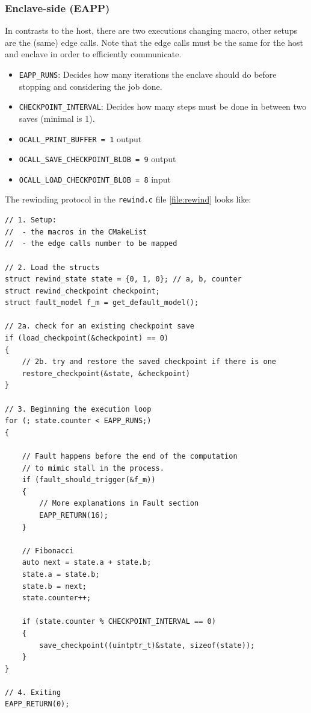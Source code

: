 \documentclass[11pt,a4paper]{report}
\begin{document}
\subsubsection{Enclave-side (EAPP)}
In contrasts to the host, there are two executions changing macro, other setups are the (same) edge calls.
Note that the edge calls must be the same for the host and enclave in order to efficiently communicate.
\begin{itemize}
    \item \verb|EAPP_RUNS|: Decides how many iterations the enclave should do before stopping and considering the job done.
    \item \verb|CHECKPOINT_INTERVAL|: Decides how many steps must be done in between two saves (minimal is 1).
    \item \verb|OCALL_PRINT_BUFFER = 1| output
    \item \verb|OCALL_SAVE_CHECKPOINT_BLOB = 9| output
    \item \verb|OCALL_LOAD_CHECKPOINT_BLOB = 8| input

\end{itemize}
The rewinding protocol in the \verb|rewind.c| file \ref{file:rewind} looks like:
\begin{verbatim}
// 1. Setup:
//  - the macros in the CMakeList 
//  - the edge calls number to be mapped

// 2. Load the structs
struct rewind_state state = {0, 1, 0}; // a, b, counter
struct rewind_checkpoint checkpoint;
struct fault_model f_m = get_default_model();

// 2a. check for an existing checkpoint save
if (load_checkpoint(&checkpoint) == 0) 
{
    // 2b. try and restore the saved checkpoint if there is one 
    restore_checkpoint(&state, &checkpoint)
}

// 3. Beginning the execution loop
for (; state.counter < EAPP_RUNS;)
{

    // Fault happens before the end of the computation 
    // to mimic stall in the process.
    if (fault_should_trigger(&f_m)) 
    {
        // More explanations in Fault section
        EAPP_RETURN(16); 
    }

    // Fibonacci
    auto next = state.a + state.b;
    state.a = state.b;
    state.b = next;
    state.counter++;

    if (state.counter % CHECKPOINT_INTERVAL == 0)
    {
        save_checkpoint((uintptr_t)&state, sizeof(state));
    }
}

// 4. Exiting
EAPP_RETURN(0);
\end{verbatim}
\end{document}
